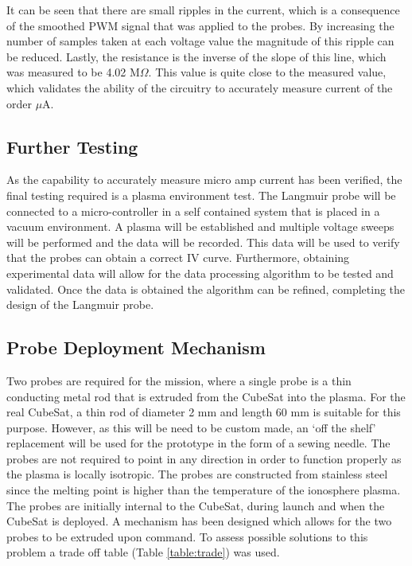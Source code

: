 It can be seen that there are small ripples in the current, which is a consequence of the smoothed PWM signal that was applied to the probes. By increasing the number of samples taken at each voltage value the magnitude of this ripple can be reduced. Lastly, the resistance is the inverse of the slope of this line, which was measured to be 4.02 M$\Omega$. This value is quite close to the measured value, which validates the ability of the circuitry to accurately measure current of the order $\mu$A.

\subsection{Further Testing}
As the capability to accurately measure micro amp current has been verified, the final testing required is a plasma environment test. The Langmuir probe will be connected to a micro-controller in a self contained system that is placed in a vacuum environment. A plasma will be established and multiple voltage sweeps will be performed and the data will be recorded. This data will be used to verify that the probes can obtain a correct IV curve. Furthermore, obtaining experimental data will allow for the data processing algorithm to be tested and validated. Once the data is obtained the algorithm can be refined, completing the design of the Langmuir probe.

\subsection{Probe Deployment Mechanism}
Two probes are required for the mission, where a single probe is a thin conducting metal rod that is extruded from the CubeSat into the plasma. For the real CubeSat, a thin rod of diameter 2 mm and length 60 mm is suitable for this purpose. However, as this will be need to be custom made, an `off the shelf' replacement will be used for the prototype in the form of a sewing needle. The probes are not required to point in any direction in order to function properly as the plasma is locally isotropic. The probes are constructed from stainless steel since the melting point is higher than the temperature of the ionosphere plasma. The probes are initially internal to the CubeSat, during launch and when the CubeSat is deployed. A mechanism has been designed which allows for the two probes to be extruded upon command. To assess possible solutions to this problem a trade off table (Table \ref{table:trade}) was used.\\

